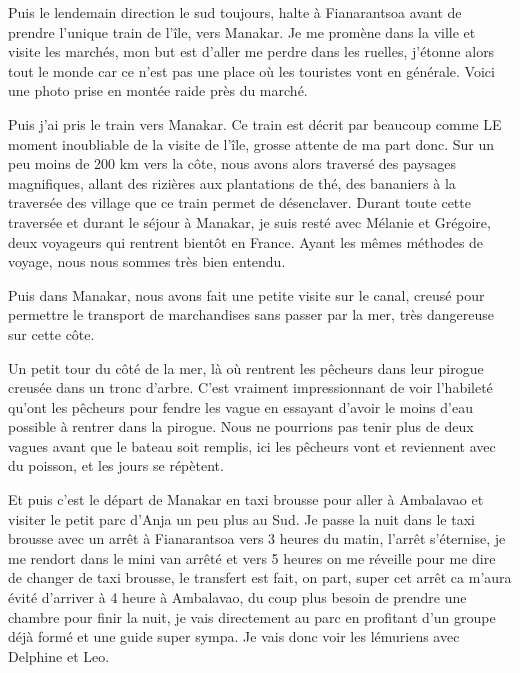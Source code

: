 \begin{multicols}{2}

Puis le lendemain direction le sud toujours, halte à Fianarantsoa avant de prendre l'unique train de l'île, vers Manakar. Je me promène dans la ville et visite les marchés, mon but est d'aller me perdre dans les ruelles, j'étonne alors tout le monde car ce n'est pas une place où les touristes vont en générale. Voici une photo prise en montée raide près du marché.


Puis j'ai pris le train vers Manakar. Ce train est décrit par beaucoup comme LE moment inoubliable de la visite de l'île, grosse attente de ma part donc. Sur un peu moins de 200 km vers la côte, nous avons alors traversé des paysages magnifiques, allant des rizières aux plantations de thé, des bananiers à la traversée des village que ce train permet de désenclaver. Durant toute cette traversée et durant le séjour à Manakar, je suis resté avec Mélanie et Grégoire, deux voyageurs qui rentrent bientôt en France. Ayant les mêmes méthodes de voyage, nous nous sommes très bien entendu.


Puis dans Manakar, nous avons fait une petite visite sur le canal, creusé pour permettre le transport de marchandises sans passer par la mer, très dangereuse sur cette côte.


Un petit tour du côté de la mer, là où rentrent les pêcheurs dans leur pirogue creusée dans un tronc d'arbre. C'est vraiment impressionnant de voir l'habileté qu'ont les pêcheurs pour fendre les vague en essayant d'avoir le moins d'eau possible à rentrer dans la pirogue. Nous ne pourrions pas tenir plus de deux vagues avant que le bateau soit remplis, ici les pêcheurs vont et reviennent avec du poisson, et les jours se répètent.


Et puis c'est le départ de Manakar en taxi brousse pour aller à Ambalavao et visiter le petit parc d'Anja un peu plus au Sud. Je passe la nuit dans le taxi brousse avec un arrêt à Fianarantsoa vers 3 heures du matin, l'arrêt s'éternise, je me rendort dans le mini van arrêté et vers 5 heures on me réveille pour me dire de changer de taxi brousse, le transfert est fait, on part, super cet arrêt ca m'aura évité d'arriver à 4 heure à Ambalavao, du coup plus besoin de prendre une chambre pour finir la nuit, je vais directement au parc en profitant d'un groupe déjà formé et une guide super sympa. Je vais donc voir les lémuriens avec Delphine et Leo.


\end{multicols}
